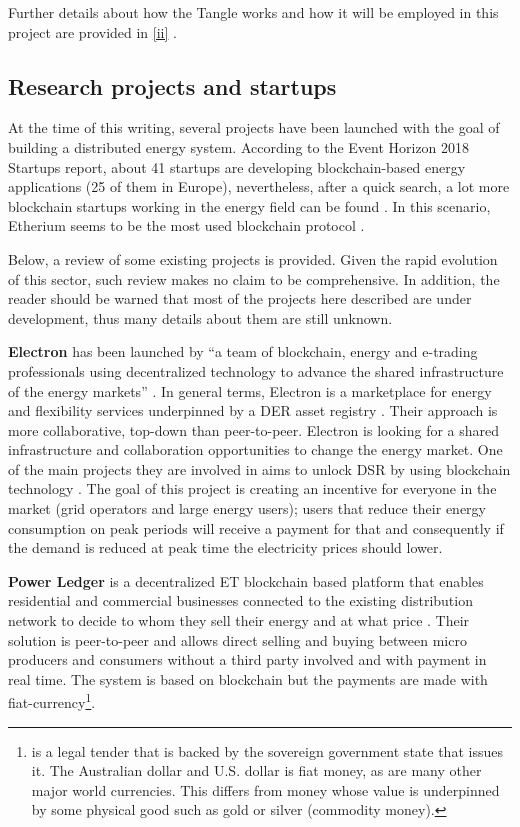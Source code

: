 Further details about how the Tangle works and how it will be employed in this project are provided in \ref{ii} . 


\subsection{Research projects and startups}
\label{rps}


At the time of this writing, several projects have been launched with the goal of building a distributed energy system. According to the Event Horizon 2018 Startups report, about 41 startups are developing blockchain-based energy applications (25 of them in Europe), nevertheless, after a quick search, a lot more blockchain startups working in the energy field can be found \cite{EnergyBlockchainStartups}. In this scenario, Etherium seems to be the most used blockchain protocol \cite{STARTUPSWHOISWHO}.



Below, a review of some existing projects is provided. Given the rapid evolution of this sector, such review makes no claim to be comprehensive. In addition, the reader should be warned that most of the projects here described are under development, thus many details about them are still unknown. 



\textbf{Electron} has been launched by “a team of blockchain, energy and e-trading professionals using decentralized technology to advance the shared infrastructure of the energy markets” \cite{Electron}. In general terms, Electron is a marketplace for energy and flexibility services underpinned by a \ac{DER} asset registry \cite{STARTUPSWHOISWHO}.
Their approach is more collaborative, top-down than peer-to-peer. Electron is looking for a shared infrastructure and collaboration opportunities to change the energy market. One of the main projects they are involved in aims to unlock \ac{DSR} by using blockchain technology \cite{demand-sideresponse}. The goal of this project is creating an incentive for everyone in the market (grid operators and large energy users); users that reduce their energy consumption on peak periods will receive a payment for that and consequently if the demand is reduced at peak time the electricity prices should lower.



\textbf{Power Ledger} is a decentralized \ac{ET} blockchain based platform that enables residential and commercial businesses connected to the existing distribution network to decide to whom they sell their energy and at what price \cite{STARTUPSWHOISWHO}. Their solution is peer-to-peer and allows direct selling and buying between micro producers and consumers without a third party involved and with payment in real time. The system is based on blockchain but the payments are made with fiat-currency\footnote{is a legal tender that is backed by the sovereign government state that issues it. The
Australian dollar and U.S. dollar is fiat money, as are many other major world currencies. This differs
from money whose value is underpinned by some physical good such as gold or silver (commodity
money).}.



